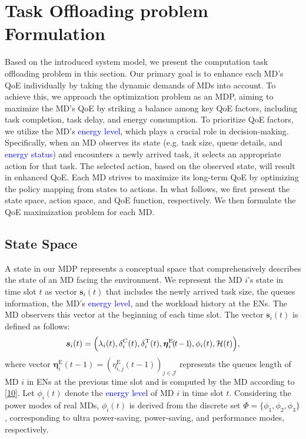 \documentclass[10pt, journal,letterpaper]{IEEEtran}
\begin{document}
\section{Task Offloading problem Formulation}
\label{section:IV}

Based on the introduced system model, we present the computation task offloading problem in this section. Our primary goal is to enhance each MD's QoE individually by taking the dynamic demands of MDs into account. To achieve this, we approach the optimization problem as an MDP, aiming to maximize the MD's QoE by striking a balance among key QoE factors, including task completion, task delay, and energy consumption. To prioritize QoE factors, we utilize the MD's \textcolor{blue}{energy level}, which plays a crucial role in decision-making. Specifically, when an MD observes its state (e.g. task size, queue details, and \textcolor{blue}{energy status}) and encounters a newly arrived task, it selects an appropriate action for that task. The selected action, based on the observed state, will result in enhanced QoE. Each MD strives to maximize its long-term QoE by optimizing the policy mapping from states to actions. In what follows, we first present the state space, action space, and QoE function, respectively. We then formulate the QoE maximization problem for each MD.




\subsection{State Space}
A state in our MDP represents a conceptual space that comprehensively describes the state of an MD facing the environment. We represent the MD $i$'s state in time slot $t$ as vector $\boldsymbol{s}_i(t)$ that includes the newly arrived task size, the queues information, the MD's \textcolor{blue}{energy level}, and the workload history at the ENs. The MD observers this vector at the beginning of each time slot. The vector $\boldsymbol{s}_i(t)$ is defined as follows:
\begin{alignat}{1}
\boldsymbol{s}_i(t) = \Big(\lambda_i(t), \delta_i^{\text{C}}(t), \delta_i^{\text{T}}(t), \boldsymbol{\eta}_i^{\text{E}}\hspace{-0.4mm}(\hspace{-0.4mm}t\hspace{-0.4mm}-\hspace{-0.4mm}1\hspace{-0.5mm}),\phi_i(t), \mathcal{H}(t) \Big),
	\label{18}
\end{alignat}
where vector $\boldsymbol{\eta}_i^{\text{E}}(t-1) = (\eta_{i,j}^{\text{E}}(t-1))_{j \in \mathcal{J}}$ represents the queues length of MD $i$ in ENs at the previous time slot and is computed by the MD according to \eqref{10}. Let $\phi_i(t)$ denote the \textcolor{blue}{energy level} of MD $i$ in time slot $t$. Considering the power modes of real MDs, $\phi_i(t)$ is derived from the discrete set $\Phi=\{\phi_1,\phi_2,\phi_3\}$, corresponding to ultra power-saving, power-saving, and performance modes, respectively.
\end{document}
